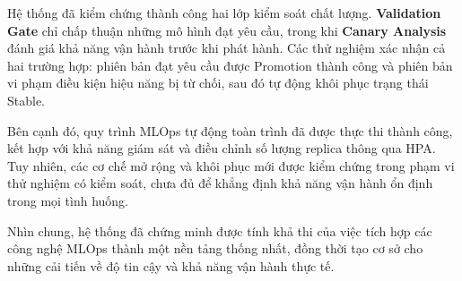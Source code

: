 Hệ thống đã kiểm chứng thành công hai lớp kiểm soát chất lượng. \textbf{Validation Gate} chỉ chấp thuận những mô hình đạt yêu cầu, trong khi \textbf{Canary Analysis} đánh giá khả năng vận hành trước khi phát hành. Các thử nghiệm xác nhận cả hai trường hợp: phiên bản đạt yêu cầu được Promotion thành công và phiên bản vi phạm điều kiện hiệu năng bị từ chối, sau đó tự động khôi phục trạng thái Stable.


Bên cạnh đó, quy trình MLOps tự động toàn trình đã được thực thi thành công, kết hợp với khả năng giám sát và điều chỉnh số lượng replica thông qua HPA. Tuy nhiên, các cơ chế mở rộng và khôi phục mới được kiểm chứng trong phạm vi thử nghiệm có kiểm soát, chưa đủ để khẳng định khả năng vận hành ổn định trong mọi tình huống.


Nhìn chung, hệ thống đã chứng minh được tính khả thi của việc tích hợp các công nghệ MLOps thành một nền tảng thống nhất, đồng thời tạo cơ sở cho những cải tiến về độ tin cậy và khả năng vận hành thực tế.

